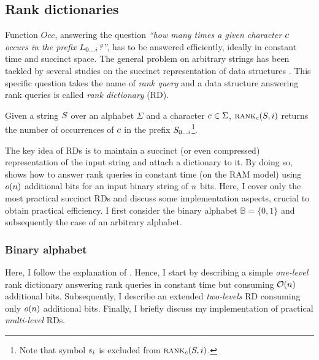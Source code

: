 \subsection{Rank dictionaries}
\label{sec:index:succinct:rd}

Function $Occ$, answering the question \emph{``how many times a given character $c$ occurs in the prefix ${L}_{{0}\dots{i}}$?''}, has to be answered efficiently, ideally in constant time and succinct space.
The general problem on arbitrary strings has been tackled by several studies on the succinct representation of data structures \citep{Jacobson1989}.
This specific question takes the name of \emph{rank query} and a data structure answering rank queries is called \emph{rank dictionary} (RD).

\begin{definition}
Given a string $S$ over an alphabet $\Sigma$ and a character $c \in \Sigma$, $\textsc{rank}_{c}(S, i)$ returns the number of occurrences of $c$ in the prefix ${S}_{{0}\dots{i}}$\footnote{Note that symbol $\Subscript{\String}{i}$ is excluded from $\textsc{rank}_{c}(S, i)$.}.
\end{definition}

The key idea of RDs is to maintain a succinct (or even compressed) representation of the input string and attach a dictionary to it.
By doing so, \cite{Jacobson1989} shows how to answer rank queries in constant time (on the RAM model) using $o(n)$ additional bits for an input binary string of $n$ bits.
Here, I cover only the most practical succinct RDs and discuss some implementation aspects, crucial to obtain practical efficiency.
I first consider the binary alphabet $\mathbb{B} = \{ 0, 1 \}$ and subsequently the case of an arbitrary alphabet.

\subsubsection{Binary alphabet}
\label{sec:index:rd:binary}

Here, I follow the explanation of \citep{Navarro2007}.
Hence, I start by describing a simple \emph{one-level} rank dictionary answering rank queries in constant time but consuming $\mathcal{O}(n)$ additional bits.
Subsequently, I describe an extended \emph{two-levels} RD consuming only $o(n)$ additional bits.
Finally, I briefly discuss my implementation of practical \emph{multi-level} RDs.

